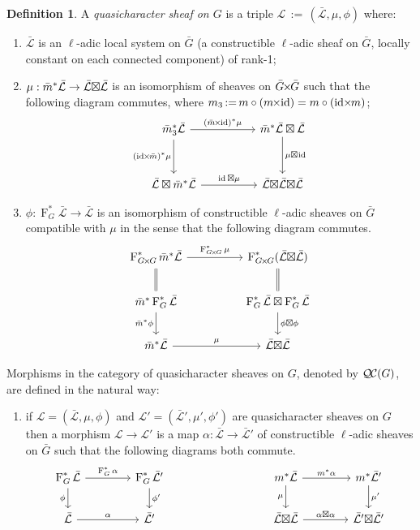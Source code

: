 \documentclass[11pt]{amsart}
\makeatletter
\theoremstyle{plain}
\theoremstyle{definition}
\newtheorem{definition}[theorem]{Definition}
\theoremstyle{remark}
\newcommand{\Frob}[1]{\operatorname{F}_{#1}}
\DeclareMathOperator{\id}{id}
\newcommand{\ceq}{{\, :=\, }}
\newcommand{\qcs}[1]{{\mathcal{#1}}}
\newcommand{\gqcs}[1]{{\mathcal{\bar #1}}}
\newcommand{\QC}{{\mathcal{Q\hskip-0.8pt C}}}
\newcommand{\labitem}[2]{%
\def\@itemlabel{\textbf{#1}}
\item
\def\@currentlabel{#1}\label{#2}}
\newcommand{\bm}{\bar{m}}
\newcommand{\bG}{\bar{G}}
\newcommand{\tight}[3]{\hspace{-#1pt}{#2}\hspace{-#3pt}}
\newcommand{\bGxG}{\text{$\bar{G} \tight{1}{\times}{1} \bar{G}$}}
\newcommand{\GxxG}{\text{$G \tight{1}{\times}{1} G$}}
\newcommand{\LxL}{\text{$\gqcs{L} \tight{0}{\boxtimes}{0} \gqcs{L}$}}
\makeatother
\begin{document}
\begin{definition}\label{def:QC}
A \emph{quasicharacter sheaf on $G$} is a triple
$\qcs{L}\ceq (\gqcs{L},\mu,\phi)$ where:
\begin{enumerate}
\labitem{(CS.0)}{CS.0} $\gqcs{L}$ is an $\ell$-adic local system on $\bG$
(a constructible $\ell$-adic sheaf on $\bG$, locally constant on each connected component) of rank-1; 
\labitem{(CS.1)}{CS.1} $\mu: \bm^* \gqcs{L} \to \LxL$
  is an isomorphism of sheaves on $\bGxG$ such that the following diagram commutes, 
  where $m_3 \ceq m\circ (m\tight{1}{\times}{2}\id) = m\circ (\id\tight{2}{\times}{1} m)$;
%
  \[
  \begin{tikzcd}[row sep=30]
  \bm_3^*\gqcs{L} \arrow{rr}{(\bm \tight{1}{\times}{2} \id)^*\mu} \arrow[swap]{d}{(\id \tight{2}{\times}{1} \bm)^*\mu}
    &&  \bm^*\gqcs{L} \boxtimes \gqcs{L} \dar{\mu \tight{0}{\boxtimes}{1} \id} \\
    \gqcs{L} \boxtimes \bm^* \gqcs{L} \arrow{rr}{\id \boxtimes \mu}
    &&  \gqcs{L} \tight{0}{\boxtimes}{0} \LxL
  \end{tikzcd}
  \]
%
\labitem{(CS.2)}{CS.2} $\phi : \Frob{G}^* \gqcs{L} \to \gqcs{L}$ is an
  isomorphism of constructible $\ell$-adic sheaves on $\bG$ compatible with $\mu$ in the sense that the following diagram commutes.
%
  \[
  \begin{tikzcd}[row sep=20]
  \Frob{\GxxG}^* \bm^* \gqcs{L} \arrow{rr}{\Frob{\GxxG}^*\mu}
    && \Frob{\GxxG}^*(\LxL)\\
    \arrow[equal]{u} \bm^*  \Frob{G}^* \gqcs{L} \arrow[swap]{d}{\bm^* \phi}
    && \Frob{G}^*\gqcs{L}\boxtimes \Frob{G}^*\gqcs{L} \dar{\phi\boxtimes \phi} \arrow[equal]{u} \\
    \bm^*\gqcs{L} \arrow{rr}{\mu}
    && \LxL
  \end{tikzcd}
  \]
\end{enumerate}
\end{definition}

Morphisms in the category of quasicharacter sheaves on $G$, denoted by $\QC(G)$, are defined in the natural way:
\begin{enumerate}
\labitem{(CS.3)}{CS.3} if $\qcs{L} = (\gqcs{L},\mu,\phi)$ and
  $\qcs{L'} = (\gqcs{L'},\mu',\phi')$ are quasicharacter sheaves on $G$ then
  a morphism $\qcs{L} \to \qcs{L}'$ is a map $\alpha : \gqcs{L} \to \gqcs{L'}$
  of constructible $\ell$-adic sheaves on $\bG$ such that the following diagrams both commute.
  \[
  \begin{tikzcd}[column sep=40]
  \Frob{G}^* \gqcs{L} \rar{\Frob{G}^* \alpha} \arrow[swap]{d}{\phi} & \Frob{G}^* \gqcs{L'} \dar{\phi'}
  & %
  & \arrow[swap]{d}{\mu} m^* \gqcs{L} \rar{m^* \alpha} & m^* \gqcs{L'} \dar{\mu'} \\
  \gqcs{L} \rar{\alpha} & \gqcs{L'}
  & {} & \LxL \rar{\tight{1}{\alpha\boxtimes \alpha}{1}} & \gqcs{L'} \tight{0}{\boxtimes}{0} \gqcs{L'}
  \end{tikzcd}
  \]
\end{enumerate}
\end{document}
